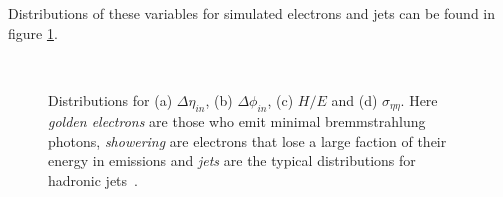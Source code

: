 Distributions of these variables for simulated electrons and jets can be found in figure \ref{FIGURE:PhysicsObjects_Electrons}. 

\begin{figure}[htp]%
\centering
{}\qquad
{}\\
\qquad
{}
\caption[Distributions for the variables $\Delta\eta_{\text in}$, $\Delta\phi_{\text in}$, $\sigma_{i\eta i\eta}$ and $H/E$ for simulated electrons and misidentified jets.]
{Distributions for (a) $\Delta\eta_{in}$, (b) $\Delta\phi_{in}$, (c) $H/E$ and (d) $\sigma_{\eta\eta}$. Here \textit{golden electrons} are those who emit minimal bremmstrahlung photons, \textit{showering} are electrons that lose a large faction of their energy in emissions and \textit{jets} are the typical distributions for hadronic jets~\cite{ARTICLE:CMSElectronReconstruction}.}
\label{FIGURE:PhysicsObjects_Electrons}
\end{figure}

